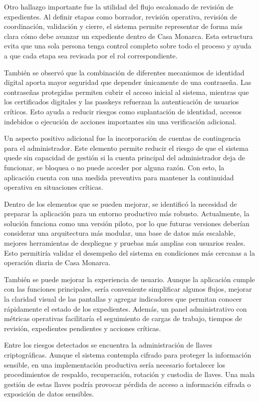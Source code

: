 \documentclass[10pt, letterpaper]{article}
\begin{document}
Otro hallazgo importante fue la utilidad del flujo escalonado de revisión de expedientes. Al definir etapas como borrador, revisión operativa, revisión de coordinación, validación y cierre, el sistema permite representar de forma más clara cómo debe avanzar un expediente dentro de Casa Monarca. Esta estructura evita que una sola persona tenga control completo sobre todo el proceso y ayuda a que cada etapa sea revisada por el rol correspondiente.

También se observó que la combinación de diferentes mecanismos de identidad digital aporta mayor seguridad que depender únicamente de una contraseña. Las contraseñas protegidas permiten cubrir el acceso inicial al sistema, mientras que los certificados digitales y las passkeys refuerzan la autenticación de usuarios críticos. Esto ayuda a reducir riesgos como suplantación de identidad, accesos indebidos o ejecución de acciones importantes sin una verificación adicional.

Un aspecto positivo adicional fue la incorporación de cuentas de contingencia para el administrador. Este elemento permite reducir el riesgo de que el sistema quede sin capacidad de gestión si la cuenta principal del administrador deja de funcionar, se bloquea o no puede acceder por alguna razón. Con esto, la aplicación cuenta con una medida preventiva para mantener la continuidad operativa en situaciones críticas.

Dentro de los elementos que se pueden mejorar, se identificó la necesidad de preparar la aplicación para un entorno productivo más robusto. Actualmente, la solución funciona como una versión piloto, por lo que futuras versiones deberían considerar una arquitectura más modular, una base de datos más escalable, mejores herramientas de despliegue y pruebas más amplias con usuarios reales. Esto permitiría validar el desempeño del sistema en condiciones más cercanas a la operación diaria de Casa Monarca.

También se puede mejorar la experiencia de usuario. Aunque la aplicación cumple con las funciones principales, sería conveniente simplificar algunos flujos, mejorar la claridad visual de las pantallas y agregar indicadores que permitan conocer rápidamente el estado de los expedientes. Además, un panel administrativo con métricas operativas facilitaría el seguimiento de cargas de trabajo, tiempos de revisión, expedientes pendientes y acciones críticas.

Entre los riesgos detectados se encuentra la administración de llaves criptográficas. Aunque el sistema contempla cifrado para proteger la información sensible, en una implementación productiva sería necesario fortalecer los procedimientos de respaldo, recuperación, rotación y custodia de llaves. Una mala gestión de estas llaves podría provocar pérdida de acceso a información cifrada o exposición de datos sensibles.
\end{document}
